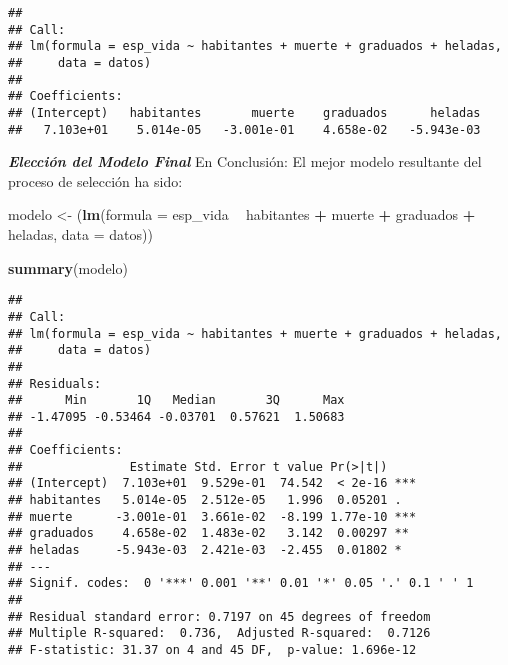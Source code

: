\documentclass[]{article}
\newenvironment{Shaded}{\begin{snugshade}}{\end{snugshade}}
\newcommand{\KeywordTok}[1]{\textcolor[rgb]{0.13,0.29,0.53}{\textbf{#1}}}
\newcommand{\DataTypeTok}[1]{\textcolor[rgb]{0.13,0.29,0.53}{#1}}
\newcommand{\StringTok}[1]{\textcolor[rgb]{0.31,0.60,0.02}{#1}}
\newcommand{\OperatorTok}[1]{\textcolor[rgb]{0.81,0.36,0.00}{\textbf{#1}}}
\newcommand{\NormalTok}[1]{#1}
\begin{document}
\begin{verbatim}
## 
## Call:
## lm(formula = esp_vida ~ habitantes + muerte + graduados + heladas, 
##     data = datos)
## 
## Coefficients:
## (Intercept)   habitantes       muerte    graduados      heladas  
##   7.103e+01    5.014e-05   -3.001e-01    4.658e-02   -5.943e-03
\end{verbatim}

\emph{\textbf{Elección del Modelo Final}} En Conclusión: El mejor modelo
resultante del proceso de selección ha sido:

\begin{Shaded}
\begin{Highlighting}[]
\NormalTok{modelo <-}\StringTok{ }\NormalTok{(}\KeywordTok{lm}\NormalTok{(}\DataTypeTok{formula =}\NormalTok{ esp_vida }\OperatorTok{~}\StringTok{ }\NormalTok{habitantes }\OperatorTok{+}\StringTok{ }\NormalTok{muerte }\OperatorTok{+}\StringTok{ }\NormalTok{graduados }\OperatorTok{+}
\StringTok{                }\NormalTok{heladas, }\DataTypeTok{data =}\NormalTok{ datos))}

\KeywordTok{summary}\NormalTok{(modelo)}
\end{Highlighting}
\end{Shaded}

\begin{verbatim}
## 
## Call:
## lm(formula = esp_vida ~ habitantes + muerte + graduados + heladas, 
##     data = datos)
## 
## Residuals:
##      Min       1Q   Median       3Q      Max 
## -1.47095 -0.53464 -0.03701  0.57621  1.50683 
## 
## Coefficients:
##               Estimate Std. Error t value Pr(>|t|)    
## (Intercept)  7.103e+01  9.529e-01  74.542  < 2e-16 ***
## habitantes   5.014e-05  2.512e-05   1.996  0.05201 .  
## muerte      -3.001e-01  3.661e-02  -8.199 1.77e-10 ***
## graduados    4.658e-02  1.483e-02   3.142  0.00297 ** 
## heladas     -5.943e-03  2.421e-03  -2.455  0.01802 *  
## ---
## Signif. codes:  0 '***' 0.001 '**' 0.01 '*' 0.05 '.' 0.1 ' ' 1
## 
## Residual standard error: 0.7197 on 45 degrees of freedom
## Multiple R-squared:  0.736,  Adjusted R-squared:  0.7126 
## F-statistic: 31.37 on 4 and 45 DF,  p-value: 1.696e-12
\end{verbatim}
\end{document}
